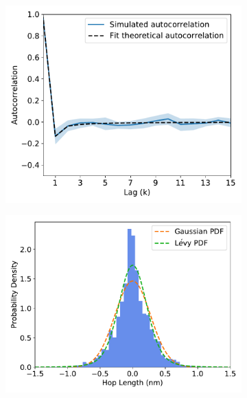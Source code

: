 \documentclass{article}
\begin{document}
\begin{figure}[h]
\begin{subfigure}{0.3\textwidth}
  \caption{}\label{fig:GCL_powerlaw}
  \end{subfigure}
  \begin{subfigure}{0.3\textwidth}
  \includegraphics[width=\textwidth]{GCL_hop_acf.pdf}
  \caption{}\label{fig:GCL_hop_acf}
  \end{subfigure}
  \begin{subfigure}{0.3\textwidth}
  \includegraphics[width=\textwidth]{gaussian_levy_comparison_anomalous_ACH.pdf}
  \caption{}\label{fig:ACH_hop_distribution_comparison}
  \end{subfigure}
  \begin{subfigure}{0.3\textwidth}

\end{subfigure}
\end{figure}
\end{document}
